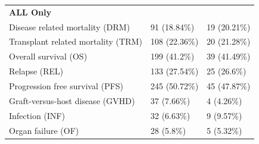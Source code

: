 \documentclass[]{DissertateOSU}
\begin{document}
\begin{table}[t]
\begin{tabular}{lll}
\multicolumn{3}{l}{\textbf{ALL Only}}\\
\hspace{1em}Disease related mortality (DRM) & 91 (18.84\%) & 19 (20.21\%)\\
\hspace{1em}Transplant related mortality (TRM) & 108 (22.36\%) & 20 (21.28\%)\\
\hspace{1em}Overall survival (OS) & 199 (41.2\%) & 39 (41.49\%)\\
\hspace{1em}Relapse (REL) & 133 (27.54\%) & 25 (26.6\%)\\
\hspace{1em}Progression free survival (PFS) & 245 (50.72\%) & 45 (47.87\%)\\
\hspace{1em}Graft-versus-host disease (GVHD) & 37 (7.66\%) & 4 (4.26\%)\\
\hspace{1em}Infection (INF) & 32 (6.63\%) & 9 (9.57\%)\\
\hspace{1em}Organ failure (OF) & 28 (5.8\%) & 5 (5.32\%)\\
\bottomrule
\end{tabular}
\end{table}

\end{document}
